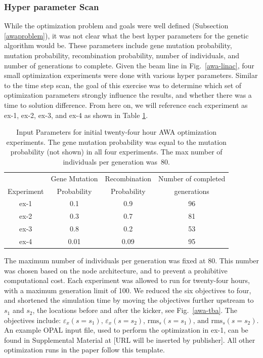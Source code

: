 \subsubsection{Hyper parameter Scan}
While the optimization problem and goals were well defined (Subsection \ref{awaproblem}), 
it was not clear what the best hyper parameters for the genetic algorithm would be.
These parameters include gene mutation probability, mutation probability, 
recombination probability, number of individuals, 
and number of generations to complete. 
Given the beam line in Fig.~\ref{awa-linac},
four small optimization experiments were done with various hyper parameters. 
Similar to the time step scan, 
the goal of this exercise was to determine which set of optimization
parameters strongly influence the results, 
and whether there was a time to solution difference.
From here on, we will reference each experiment as ex-1, ex-2, ex-3, and ex-4
as shown in Table \ref{extable}. 
\begin{table}%
\begin{center}
\caption{Input Parameters for initial twenty-four hour AWA optimization experiments. 
The gene mutation probability was equal to the mutation probability (not shown) in all four experiments. 
The max number of individuals per generation was~80.}
\vspace{1em}
\label{extable}
\begin{tabular}{c|c|c|c}
\cline{1-4}
& Gene Mutation \qquad& Recombination \qquad & Number of completed \vspace{-0.75em}\\
Experiment & Probability & Probability &  generations \\ 
\cline{1-4}
ex-1 &  0.1  & 0.9  &  96 \\
ex-2 &  0.3  & 0.7  &  81 \\
ex-3 &  0.8  & 0.2  &  53 \\
ex-4 &  0.01 & 0.09 &  95 \\ 
\cline{1-4}
\end{tabular}
\end{center}
\end{table}

The maximum number of individuals per generation was fixed at 80. 
This number was chosen based on the node architecture, and  
to prevent a prohibitive computational cost.  
Each experiment was allowed to run for twenty-four hours, with 
a maximum generation limit of 100. 
We reduced the six objectives to four, 
and shortened the simulation time by moving the objectives further 
upstream to $s_1$ and $s_2$, the locations before and after the kicker, 
see Fig.~\ref{awa-tba}.  
The objectives include: $\varepsilon_{x}\left(s = s_1\right)\text{, } \varepsilon_{x}\left(s = s_2\right)$, $\text{rms}_{s}\left(s = s_1\right)\text{, and }  \text{rms}_{s}\left(s = s_2\right)$. 
An example OPAL input file, used to perform the optimization in ex-1, 
can be found in Supplemental Material at [URL will be inserted by publisher].
All other optimization runs in the paper follow this template.

